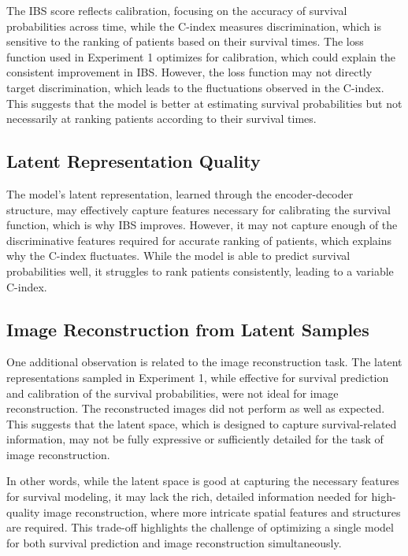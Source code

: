 \documentclass{article}
\begin{document}
The IBS score reflects calibration, focusing on the accuracy of survival probabilities across time, while the C-index measures discrimination, which is sensitive to the ranking of patients based on their survival times. The loss function used in Experiment 1 optimizes for calibration, which could explain the consistent improvement in IBS. However, the loss function may not directly target discrimination, which leads to the fluctuations observed in the C-index. This suggests that the model is better at estimating survival probabilities but not necessarily at ranking patients according to their survival times.

\subsection{Latent Representation Quality}

The model’s latent representation, learned through the encoder-decoder structure, may effectively capture features necessary for calibrating the survival function, which is why IBS improves. However, it may not capture enough of the discriminative features required for accurate ranking of patients, which explains why the C-index fluctuates. While the model is able to predict survival probabilities well, it struggles to rank patients consistently, leading to a variable C-index.

\subsection{Image Reconstruction from Latent Samples}

One additional observation is related to the image reconstruction task. The latent representations sampled in Experiment 1, while effective for survival prediction and calibration of the survival probabilities, were not ideal for image reconstruction. The reconstructed images did not perform as well as expected. This suggests that the latent space, which is designed to capture survival-related information, may not be fully expressive or sufficiently detailed for the task of image reconstruction.

In other words, while the latent space is good at capturing the necessary features for survival modeling, it may lack the rich, detailed information needed for high-quality image reconstruction, where more intricate spatial features and structures are required. This trade-off highlights the challenge of optimizing a single model for both survival prediction and image reconstruction simultaneously.
\end{document}
